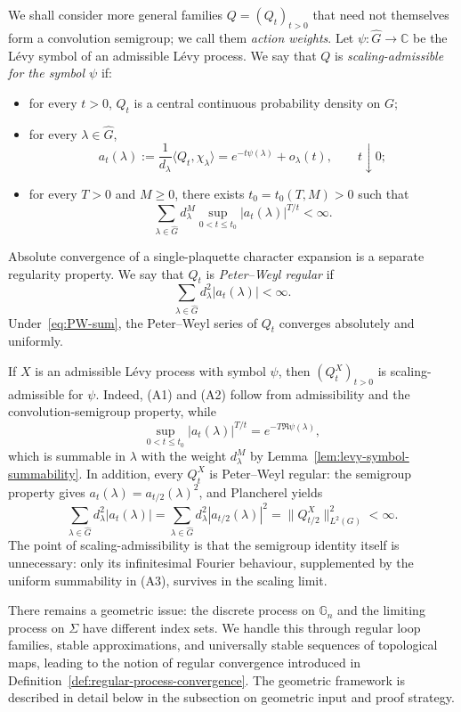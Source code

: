 \documentclass[11pt,a4paper,reqno]{article}
\theoremstyle{definition}
\theoremstyle{remark}
\newcommand\C{\mathbb{C}}
\newcommand\Gbb{{\mathbb{G}}}
\begin{document}
We shall consider more general families $Q=(Q_t)_{t>0}$ that need not themselves form a convolution semigroup; we call them \emph{action weights}. Let $\psi:\widehat G\to\C$ be the L\'evy symbol of an admissible L\'evy process. We say that $Q$ is \emph{scaling-admissible for the symbol $\psi$} if:
\begin{itemize}
\item[(A1)] for every $t>0$, $Q_t$ is a central continuous probability density on $G$;
\item[(A2)] for every $\lambda\in\widehat G$,
\[
 a_t(\lambda):=\frac{1}{d_\lambda}\langle Q_t,\chi_\lambda\rangle
 =e^{-t\psi(\lambda)}+o_\lambda(t),\qquad t\downarrow0;
\]
\item[(A3)] for every $T>0$ and $M\geq0$, there exists $t_0=t_0(T,M)>0$ such that
\begin{equation}\label{eq:single-plaquette-summability}
 \sum_{\lambda\in\widehat G}
 d_\lambda^M
 \sup_{0<t\leq t_0}|a_t(\lambda)|^{T/t}
 <\infty.
\end{equation}
\end{itemize}

Absolute convergence of a single-plaquette character expansion is a separate regularity property. We say that $Q_t$ is \emph{Peter--Weyl regular} if
\begin{equation}\label{eq:PW-sum}
 \sum_{\lambda\in\widehat G}d_\lambda^2|a_t(\lambda)|<\infty.
\end{equation}
Under~\eqref{eq:PW-sum}, the Peter--Weyl series of $Q_t$ converges absolutely and uniformly.

If $X$ is an admissible L\'evy process with symbol $\psi$, then $(Q_t^X)_{t>0}$ is scaling-admissible for $\psi$. Indeed, (A1) and (A2) follow from admissibility and the convolution-semigroup property, while
\[
 \sup_{0<t\leq t_0}|a_t(\lambda)|^{T/t}=e^{-T\Re\psi(\lambda)},
\]
which is summable in  $\lambda$ with the weight $d_\lambda^M$ by Lemma~\ref{lem:levy-symbol-summability}. In addition, every $Q_t^X$ is Peter--Weyl regular: the semigroup property gives $a_t(\lambda)=a_{t/2}(\lambda)^2$, and Plancherel yields
\[
 \sum_{\lambda\in\widehat G}d_\lambda^2|a_t(\lambda)|
 =\sum_{\lambda\in\widehat G}d_\lambda^2|a_{t/2}(\lambda)|^2
 =\|Q_{t/2}^X\|_{L^2(G)}^2<\infty.
\]
The point of scaling-admissibility is that the semigroup identity itself is unnecessary: only its infinitesimal Fourier behaviour, supplemented by the uniform summability in (A3), survives in the scaling limit.

There remains a geometric issue: the discrete process on $\Gbb_n$ and the limiting process on $\Sigma$ have different index sets. We handle this through regular loop families, stable approximations, and universally stable sequences of topological maps, leading to the notion of regular convergence introduced in Definition~\ref{def:regular-process-convergence}. The geometric framework is described in detail below in the subsection on geometric input and proof strategy.
\end{document}
